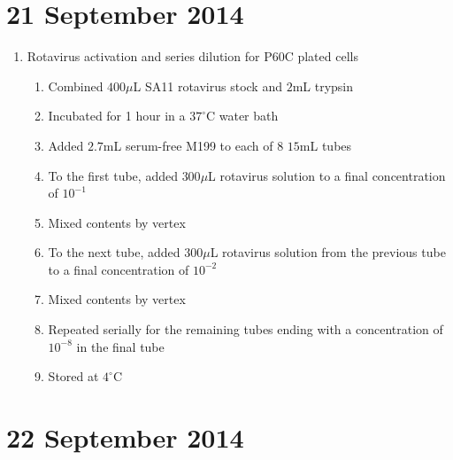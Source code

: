 
\section*{21 September 2014}

\begin{enumerate}
	\item Rotavirus activation and series dilution for P60C plated cells
		\begin{enumerate}
			\item Combined $400\mu$L SA11 rotavirus stock and $2$mL trypsin
			\item Incubated for 1 hour in a $37^{\circ}$C water bath
			\item Added $2.7$mL serum-free M199 to each of 8 $15$mL tubes
			\item To the first tube, added $300\mu$L rotavirus solution to a final concentration of $10^{-1}$
			\item Mixed contents by vertex
			\item To the next tube, added $300\mu$L rotavirus solution from the previous tube to a final concentration of $10^{-2}$
			\item Mixed contents by vertex
			\item Repeated serially for the remaining tubes ending with a concentration of $10^{-8}$ in the final tube
			\item Stored at $4^{\circ}$C
		\end{enumerate}
\end{enumerate}

\section*{22 September 2014}

